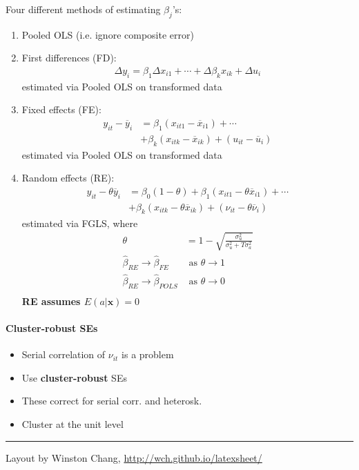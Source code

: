 \documentclass[10pt,landscape]{article}
\begin{document}
\begin{multicols}{3}
\medskip{}

Four different methods of estimating $\beta_j$'s:
\begin{enumerate}
    \item Pooled OLS (i.e. ignore composite error)
    \item First differences (FD):
\begin{align*}
    \Delta y_{i} = \beta_1 \Delta x_{i1} + \cdots + \Delta \beta_k x_{ik} + \Delta u_{i}
\end{align*}
estimated via Pooled OLS on transformed data
    \item Fixed effects (FE):
\begin{align*}
    y_{it}-\overline{y}_{i} &= \beta_1 \left(x_{it1}-\overline{x}_{i1}\right) + \cdots \\
    &+\beta_k \left( x_{itk}-\overline{x}_{ik}\right) + \left(u_{it}-\overline{u}_{i}\right)
\end{align*}
estimated via Pooled OLS on transformed data
    \item Random effects (RE):
\begin{align*}
    y_{it}-\theta\overline{y}_{i} &= \beta_0 \left(1-\theta\right) + \beta_1 \left(x_{it1}-\theta\overline{x}_{i1}\right) + \cdots \\
    &+\beta_k \left( x_{itk}-\theta\overline{x}_{ik}\right) + \left(\nu_{it}-\theta\overline{\nu}_{i}\right)
\end{align*}
estimated via FGLS, where
\begin{align*}
    \theta &= 1-\sqrt{\frac{\sigma^2_u}{\sigma^2_u + T\sigma^2_a}} \\
    \hat{\beta}_{RE} \rightarrow \hat{\beta}_{FE} & \text{ as } \theta \rightarrow 1 \\
    \hat{\beta}_{RE} \rightarrow \hat{\beta}_{POLS} & \text{ as } \theta \rightarrow 0 \\
\end{align*}
\textbf{RE assumes $E\left(a\vert\mathbf{x}\right)= 0$}
\end{enumerate}

\paragraph{Cluster-robust SEs}
\begin{itemize}
    \item Serial correlation of $\nu_{it}$ is a problem
    \item Use \textbf{cluster-robust} SEs
    \item These correct for serial corr. and heterosk.
    \item Cluster at the unit level
\end{itemize}


\textcolor{white}{\lipsum[1-4]}

\rule{0.3\linewidth}{0.25pt}
\scriptsize

Layout by Winston Chang, \href{http://wch.github.io/latexsheet/}{http://wch.github.io/latexsheet/}
\end{multicols}
\end{document}
